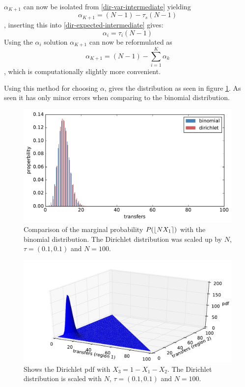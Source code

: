 $\alpha_{K+1}$ can now be isolated from \eqref{dir-var-intermediate} yielding
\begin{equation}
\alpha_{K+1} = (N - 1) - \tau_s (N - 1)
\end{equation}
, inserting this into \eqref{dir-expected-intermediate} gives:
\begin{equation}
\alpha_{i} = \tau_i (N - 1)
\end{equation}
Using the $\alpha_{i}$ solution $\alpha_{K+1}$ can now be reformulated as
\begin{equation}
\alpha_{K+1} = (N - 1) - \sum_{i=1}^K \alpha_k
\end{equation}
, which is computationally slightly more convenient.

Using this method for choosing $\alpha$, gives the distribution as seen in figure \ref{fig:dirichlet-validation-marginal}. As seen it has only minor errors when comparing to the binomial distribution.

\begin{figure}[H]
	\centering
	\includegraphics[width= 0.8 \linewidth]{plots/dirichlet-validation-marginal}
	\caption{Comparison of the marginal probability $P(\iround*{N X_1})$ with the binomial distribution. The Dirichlet distribution was scaled up by $N$, $\tau = (0.1, 0.1)$ and $N = 100$.}
	\label{fig:dirichlet-validation-marginal}
\end{figure}

\begin{figure}[H]
	\centering
	\includegraphics[width= 0.8 \linewidth]{plots/dirichlet-validation-pdf}
	\caption{Shows the Dirichlet pdf with $X_3 = 1- X_1 - X_2$. The Dirichlet distribution is scaled with $N$, $\tau = (0.1, 0.1)$ and $N = 100$.}
\end{figure}


